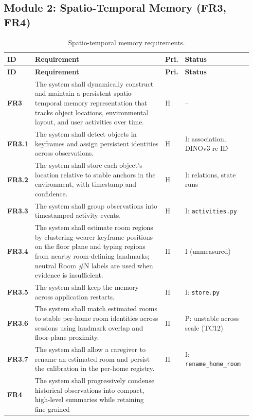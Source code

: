 \subsection{Module 2: Spatio-Temporal Memory (FR3, FR4)}
\begin{ltab}
\begin{longtable}{@{}>{\bfseries}L{1.2cm}L{9.6cm}L{0.8cm}L{3.0cm}@{}}
\caption{Spatio-temporal memory requirements.}\\
\toprule
{}\textbf{ID} & \textbf{Requirement} & \textbf{Pri.} & \textbf{Status}\\
\midrule
\endfirsthead
\toprule
{}\textbf{ID} & \textbf{Requirement} & \textbf{Pri.} & \textbf{Status}\\
\midrule
\endhead
\bottomrule
\endfoot
{}FR3 & The system shall dynamically construct and maintain a
persistent spatio-temporal memory representation that tracks object locations,
environmental layout, and user activities over time. & H & --\\
FR3.1 & The system shall detect objects in keyframes and assign persistent
identities across observations. & H & I: association, DINOv3 re-ID\\
FR3.2 & The system shall store each object's location relative to stable anchors
in the environment, with timestamp and confidence. & H & I: relations, state runs\\
FR3.3 & The system shall group observations into timestamped activity events. & H & I: \texttt{activities.py}\\
FR3.4 & The system shall estimate room regions by clustering wearer keyframe positions on the floor plane and typing regions from nearby room-defining landmarks; neutral Room \#N labels are used when evidence is insufficient. & H & I (unmeasured)\\
FR3.5 & The system shall keep the memory across application restarts. & H & I: \texttt{store.py}\\
FR3.6 & The system shall match estimated rooms to stable per-home room identities across sessions using landmark overlap and floor-plane proximity. & H & P: unstable across scale (TC12)\\
FR3.7 & The system shall allow a caregiver to rename an estimated room and persist the calibration in the per-home registry. & H & I: \texttt{rename\_home\_room}\\
FR4 & The system shall progressively condense historical
observations into compact, high-level summaries while retaining fine-grained

\end{longtable}
\end{ltab}

